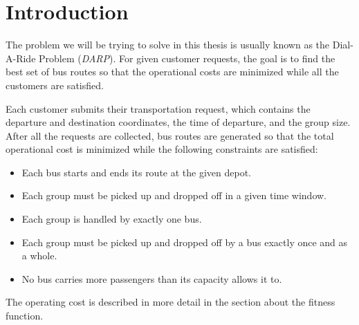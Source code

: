 \chapter*{Introduction}


\newpage


The problem we will be trying to solve in this thesis is usually known as the Dial-A-Ride Problem (\textit{DARP}). For given customer requests, the goal is to find the best set of bus routes so that the operational costs are minimized while all the customers are satisfied.

\hspace{0pt}

Each customer submits their transportation request, which contains the departure and destination coordinates, the time of departure, and the group size. After all the requests are collected, bus routes are generated so that the total operational cost is minimized while the following constraints are satisfied:
\begin{itemize}
    \setlength\itemsep{0pt}
    \item Each bus starts and ends its route at the given depot.
    \item Each group must be picked up and dropped off in a given time window.
    \item Each group is handled by exactly one bus.
    \item Each group must be picked up and dropped off by a bus exactly once and as a whole.
    \item No bus carries more passengers than its capacity allows it to.
\end{itemize}
The operating cost is described in more detail in the section about the fitness function.


